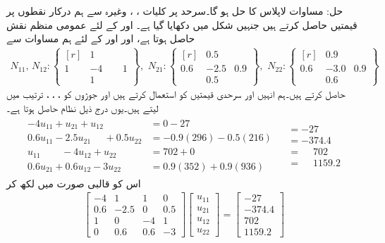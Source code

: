 حل:\quad
مساوات لاپلاس کا حل  ہو گا۔سرحد پر کلیات ، ، وغیرہ سے ہم درکار نقطوں پر قیمتیں حاصل کرتے ہیں جنہیں شکل میں دکھایا گیا ہے۔ اور  کے لئے  عمومی منظم نقش حاصل ہوتا ہے، اور  اور  کے لئے ہم مساوات  سے
\begin{align}\label{مساوات_اعدادی_مثال_لاپلاس_ڈرشلے}
N_{11}, \, N_{12}:
\left\{ 
\begin{matrix*}[r]
&1&\\
1&-4&\phantom{-}1\\
&1&
\end{matrix*}
 \right\},\,\,
N_{21}:\left\{
\begin{matrix*}[r]
&0.5&\\
0.6&-2.5&0.9\\
&0.5&
\end{matrix*}
\right\},\,\,
N_{22}:\left\{
\begin{matrix*}[r]
&0.9&\\
0.6&-3.0&0.9\\
&0.6&
\end{matrix*}
\right\}
\end{align}
حاصل کرتے ہیں۔ہم  انہیں اور سرحدی قیمتیں  کو استعمال کرتے ہیں اور جوڑوں  کو ، ، ،  ترتیب میں  لیتے ہیں۔یوں درج ذیل نظام حاصل ہوتا ہے۔
\begin{gather*}
\begin{aligned}
-4u_{11}+u_{21}+u_{12}\phantom{+u_{32}}&=0-27\\
0.6u_{11}-2.5u_{21}\phantom{u_{32}}+0.5u_{22}&=-0.9(296)-0.5(216)\\
u_{11}\phantom{+u_{32}}-4u_{12}+u_{22}&=702+0\\
0.6u_{21}+0.6u_{12}-3u_{22}&=0.9(352)+0.9(936)
\end{aligned}
\begin{aligned}
&=-27\\
&=-374.4\\
&=\phantom{-}702\\
&=\phantom{-}1159.2
\end{aligned}
\end{gather*}
اس کو قالبی صورت میں لکھ کر
\begin{align}\label{مساوات_اعدادی_مثال_لاپلاس_ڈرشلے_ب}
\begin{bmatrix}
-4&1&1&0\\
0.6&-2.5&0&0.5\\
1&0&-4&1\\
0&0.6&0.6&-3
\end{bmatrix}
\begin{bmatrix}
u_{11}\\
u_{21}\\
u_{12}\\
u_{22}
\end{bmatrix}=
\begin{bmatrix}
-27\\
-374.4\\
702\\
1159.2
\end{bmatrix}
\end{align}
